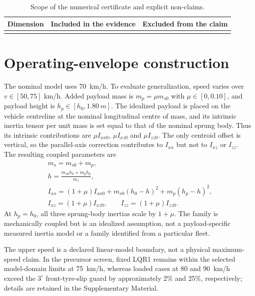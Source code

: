 \documentclass[fleqn,final,5p,times]{elsarticle}
\newcommand{\inputsubmissiontable}[1]{%
  \IfFileExists{tables/#1}%
    {}%
    {}}
\begin{document}
\begin{table}[!t]
\centering\scriptsize
\caption{Scope of the numerical certificate and explicit non-claims.}
\label{tab:certificate-scope}
\begin{tabularx}{\textwidth}{@{}>{\raggedright\arraybackslash}p{}>{\raggedright\arraybackslash}X>{\raggedright\arraybackslash}X@{}}
\toprule
Dimension & Included in the evidence & Excluded from the claim\\
\midrule
\inputsubmissiontable{certificate_scope.tex}
\end{tabularx}
\end{table}

\section{Operating-envelope construction}
\label{sec:envelope}

The nominal model uses \SI{70}{km/h}. To evaluate generalization, speed varies over $v\in[50,75]$ km/h. Added payload mass is $m_p=\mu m_{s0}$ with $\mu\in[0,0.10]$, and payload height is $h_p\in[h_0,\SI{1.80}{m}]$. The idealized payload is placed on the vehicle centreline at the nominal longitudinal centre of mass, and its intrinsic inertia tensor per unit mass is set equal to that of the nominal sprung body. Thus its intrinsic contributions are $\mu I_{xx0}$, $\mu I_{xz0}$ and $\mu I_{zz0}$. The only centroid offset is vertical, so the parallel-axis correction contributes to $I_{xx}$ but not to $I_{xz}$ or $I_{zz}$. The resulting coupled parameters are
\begin{equation}
\begin{alignedat}{1}
&m_s=m_{s0}+m_p,\\
&h=\frac{m_{s0}h_0+m_ph_p}{m_s},\\
&I_{xx}=(1+\mu)I_{xx0}+m_{s0}(h_0-h)^2+m_p(h_p-h)^2,\\
&I_{xz}=(1+\mu)I_{xz0},\qquad I_{zz}=(1+\mu)I_{zz0}.
\end{alignedat}
\label{eq:payload}
\end{equation}
At $h_p=h_0$, all three sprung-body inertias scale by $1+\mu$. The family is mechanically coupled but is an idealized assumption, not a payload-specific measured inertia model or a family identified from a particular fleet.

The upper speed is a declared linear-model boundary, not a physical maximum-speed claim. In the precursor screen, fixed LQR1 remains within the selected model-domain limits at \SI{75}{km/h}, whereas loaded cases at 80 and \SI{90}{km/h} exceed the $3^\circ$ front-tyre-slip guard by approximately 2\% and 25\%, respectively; details are retained in the Supplementary Material.
\end{document}
